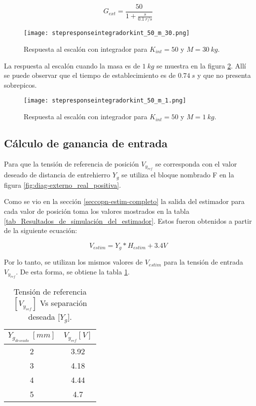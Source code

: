 \begin{equation} \label{eq_gexterno}
	G_{ext}=\frac{50}{1+\frac{s}{0.1\:r/s}}	
\end{equation}

\begin{figure}[H]
	\centering
	\texttt{[image: stepresponseintegradorkint\_50\_m\_30.png]}
	\caption{Respuesta al escalón con integrador para $K_{int}=50$ y $M = 30\:kg$.}
	\label{fig:respuesta-al-escalon-con-k-50-M-30}
\end{figure}

\noindent La respuesta al escal\'{o}n cuando la masa es de $1 \:kg$ se muestra en la figura \ref{fig:respuesta-al-escalon-con-k-50-M-1}. All\'{i} se puede observar que el tiempo de establecimiento es de $0.74\:s$ y que no presenta sobrepicos.

\begin{figure}[H]
	\centering
	\texttt{[image: stepresponseintegradorkint\_50\_m\_1.png]}
	\caption{Respuesta al escalón con integrador para $K_{int} =50$ y $M = 1 \:kg$.}
	\label{fig:respuesta-al-escalon-con-k-50-M-1}
\end{figure}


\subsection{Cálculo de ganancia de entrada} \label{sec_calculo_F}

Para que la tensión de referencia de posición $V_{y_{ref}}$ se corresponda con el valor deseado de distancia de entrehierro $Y_g$ se utiliza el bloque nombrado F en la figura \ref{fig:diag-externo_real_positiva}. 

Como se vio en la sección \ref{seccopn-estim-completo} la salida del estimador para cada valor de posición toma los  valores mostrados en la tabla \ref{tab_Resultados_de_simulación_del_estimador}. Estos fueron obtenidos a partir de la siguiente ecuación:

\begin{equation}
	V_{estim}=Y_g*H_{estim}+3.4V
\end{equation}


Por lo tanto, se utilizan los mismos valores de $V_{estim}$ para la tensión de entrada $V_{y_{ref}}$. De esta forma, se obtiene la tabla \ref{tension-ref-vs-separacion-deseada}.

\begin{table}[H]
	\begin{center}
		\begin{tabular}{| c | c |}
			\hline
			$Y_{g_{deseado}}\:[mm]$ & $V_{y_{ref}}[V]$\\ \hline
			2 &	3.92 \\ \hline
			3 & 4.18\\ \hline
			4 & 4.44 \\ \hline
			5 & 4.7\\ \hline
		\end{tabular}
		\caption{Tensión de referencia $[V_{y_{ref}}]$ Vs separación deseada [$Y_g$].}
		\label{tension-ref-vs-separacion-deseada}
	\end{center}
\end{table}

